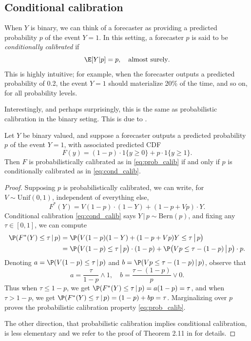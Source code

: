 \documentclass{article}
\begin{document}
\subsection{Conditional calibration}

When $Y$ is binary, we can think of a forecaster as providing a predicted
probability $p$ of the event $Y = 1$. In this setting, a forecaster $p$ is said
to be \emph{conditionally calibrated} if
\begin{equation}
\label{eq:cond_calib}
\E[Y|p] = p, \quad \text{almost surely}.  
\end{equation}
This is highly intuitive; for example, when the forecaster outputs a predicted
probability of 0.2, the event $Y=1$ should materialize 20\% of the time, and so
on, for all probability levels. 

Interestingly, and perhaps surprisingly, this is the same as probabilistic
calibration in the binary seting. This is due to \citet{gneiting2013combining}. 

\begin{theorem}
Let $Y$ be binary valued, and suppose a forecaster outputs a predicted
probability $p$ of the event $Y = 1$, with associated predicted CDF 
\[
F(y) = (1-p) \cdot 1\{y \geq 0\} +  p \cdot 1\{y \geq 1\}.
\]
Then $F$ is probabilistically calibrated as in \eqref{eq:prob_calib} if and only 
if $p$ is conditionally calibrated as in \eqref{eq:cond_calib}. 
\end{theorem}

\begin{proof}
Supposing $p$ is probabilistically calibrated, we can write, for $V \sim
\mathrm{Unif}(0,1)$, independent of everything else,  
\[
F^*(Y) = V (1-p) \cdot (1-Y) + (1-p + V p) \cdot Y.
\]
Conditional calibration \eqref{eq:cond_calib} says $Y\,|\,p \sim
\mathrm{Bern}(p)$, and fixing any $\tau \in [0,1]$, we can compute
\begin{align*}
\P(F^*(Y) \leq \tau \,|\, p) 
&= \P\big( V (1-p) (1-Y) + (1-p + V p) Y \leq \tau \,\big|\, p \big) \\ 
&= \P\big( V (1-p) \leq \tau \,\big|\, p \big) \cdot (1-p) + \P\big( V p \leq   
  \tau-(1-p) \,\big|\, p \big) \cdot p. 
\end{align*}
Denoting $a = \P(V (1-p) \leq \tau \,|\, p)$ and $b = \P(V p \leq \tau-(1-p)
\,|\, p)$, observe that
\[
a = \frac{\tau}{1-p} \wedge 1, 
\quad
b = \frac{\tau-(1-p)}{p} \vee 0.
\]
Thus when $\tau \leq 1-p$, we get $\P(F^*(Y) \leq \tau \,|\, p) = a(1-p) =
\tau$, and when $\tau > 1-p$, we get $\P(F^*(Y) \leq \tau \,|\, p) = (1-p) + bp
= \tau$. Marginalizing over $p$ proves the probabilistic calibration property
\eqref{eq:prob_calib}.

The other direction, that probabilistic calibration implies conditional
calibration, is less elementary and we refer to the proof of Theorem 2.11 in
\citet{gneiting2013combining} for details. 
\end{proof}
\end{document}
